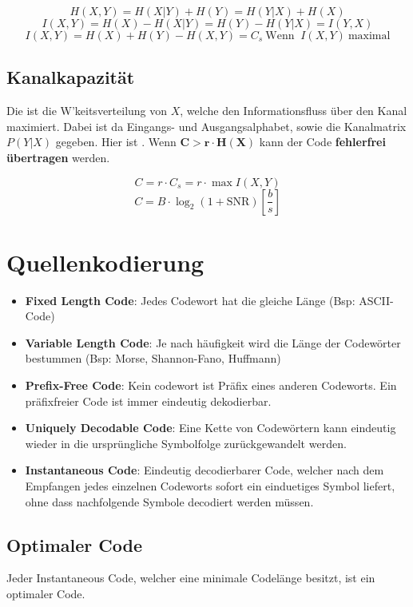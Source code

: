 \documentclass[a4paper]{article}
\begin{document}
\begin{twocolumn}
\begin{center}
\end{center}

$$H(X,Y) = H(X|Y) + H(Y) = H(Y|X) + H(X)$$
$$I(X,Y) = H(X) - H(X|Y) = H(Y) - H(Y|X) = I(Y,X)$$
$$I(X,Y) = H(X) + H(Y) - H(X,Y) = C_s \: \text{Wenn } \: I(X,Y) \: \text{maximal}$$

\subsection{Kanalkapazität}
Die  ist die W'keitsverteilung von $X$, welche den Informationsfluss über den 
Kanal maximiert. Dabei ist da Eingangs- und Ausgangsalphabet, sowie die Kanalmatrix $P(Y|X)$ gegeben. Hier ist 
. Wenn $\mathbf{C > r \cdot H(X)}$ kann der Code \textbf{fehlerfrei übertragen} werden.

$$C = r \cdot C_s = r \cdot \max I(X,Y)$$
$$C = B \cdot \log_2{(1+ \text{SNR})} \left[\frac{b}{s}\right]$$

\section{Quellenkodierung}
\begin{itemize}
  \item \textbf{Fixed Length Code}: Jedes Codewort hat die gleiche Länge (Bsp: ASCII-Code)
  \item \textbf{Variable Length Code}: Je nach häufigkeit wird die Länge der Codewörter bestummen (Bsp: 
        Morse, Shannon-Fano, Huffmann)
  \item \textbf{Prefix-Free Code}: Kein codewort ist Präfix eines anderen Codeworts. Ein präfixfreier Code ist immer eindeutig dekodierbar.
  \item \textbf{Uniquely Decodable Code}: Eine Kette von Codewörtern kann eindeutig wieder in die ursprüngliche 
        Symbolfolge zurückgewandelt werden.
  \item \textbf{Instantaneous Code}: Eindeutig decodierbarer Code, welcher nach dem Empfangen jedes einzelnen
        Codeworts sofort ein einduetiges Symbol liefert, ohne dass nachfolgende Symbole decodiert werden müssen.
\end{itemize}

\subsection{Optimaler Code}
Jeder Instantaneous Code, welcher eine minimale Codelänge besitzt, ist ein optimaler Code. 


\end{twocolumn}
\end{document}
